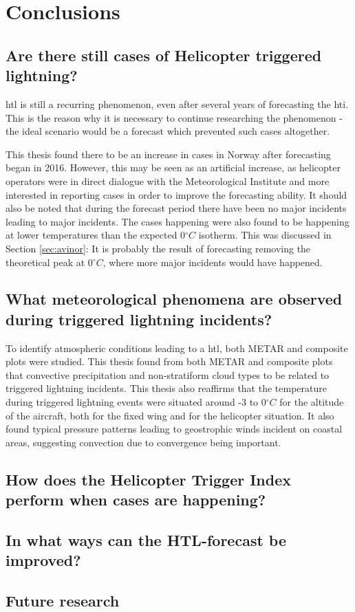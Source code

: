 \chapter{Conclusions}
\section{Are there still cases of Helicopter triggered lightning?}
\acrlong{htl} is still a recurring phenomenon, even after several years of forecasting the \acrlong{hti}. This is the reason why it is necessary to continue researching the phenomenon - the ideal scenario would be a forecast which prevented such cases altogether. 

This thesis found there to be an increase in cases in Norway after forecasting began in 2016. However, this may be seen as an artificial increase, as helicopter operators were in direct dialogue with the Meteorological Institute and more interested in reporting cases in order to improve the forecasting ability. It should also be noted that during the forecast period there have been no major incidents leading to major incidents. The cases happening were also found to be happening at lower temperatures than the expected 0$^{\circ}C$ isotherm. This was discussed in Section \ref{sec:avinor}: It is probably the result of forecasting removing the theoretical peak at 0$^{\circ}C$, where more major incidents would have happened.

\section{What meteorological phenomena are observed during triggered lightning incidents?}
To identify atmospheric conditions leading to a \acrshort{htl}, both METAR and composite plots were studied. This thesis found from both METAR and composite plots that convective precipitation and non-stratiform cloud types to be related to triggered lightning incidents. This thesis also reaffirms that the temperature during triggered lightning events were situated around -3 to 0$^{\circ}C$ for the altitude of the aircraft, both for the fixed wing and for the helicopter situation. It also found typical pressure patterns leading to geostrophic winds incident on coastal areas, suggesting convection due to convergence being important.

\section{How does the Helicopter Trigger Index perform when cases are happening?}

\section{In what ways can the HTL-forecast be improved?}

\section{Future research}